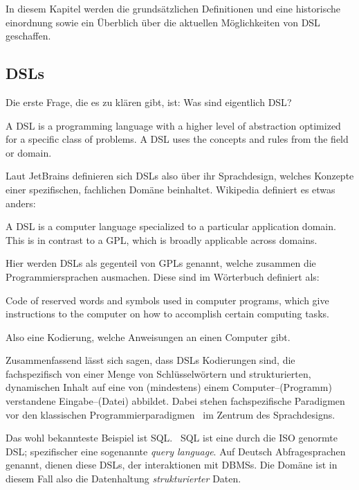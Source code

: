 In diesem Kapitel werden die grundsätzlichen Definitionen und eine historische einordnung sowie ein Überblich über die aktuellen Möglichkeiten von \ac{DSL} geschaffen.

\subsection{\aclp{DSL}}\label{subsec:domain-specific-languages}
Die erste Frage, die es zu klären gibt, ist: Was sind eigentlich \ac{DSL}?
\begin{displayquote}
    A \ac{DSL} is a programming language with a higher level of abstraction optimized for a specific class of problems.
    A \ac{DSL} uses the concepts and rules from the field or domain.
\end{displayquote}
Laut JetBrains definieren sich \acp{DSL} also über ihr Sprachdesign, welches Konzepte einer spezifischen, fachlichen Domäne beinhaltet.
Wikipedia definiert es etwas anders:
\begin{displayquote}
    A \ac{DSL} is a computer language specialized to a particular application domain.
    This is in contrast to a \ac{GPL}, which is broadly applicable across domains.
\end{displayquote}
Hier werden \acp{DSL} als gegenteil von \acp{GPL} genannt, welche zusammen die Programmiersprachen ausmachen.
Diese sind im Wörterbuch definiert als:
\begin{displayquote}
    Code of reserved words and symbols used in computer programs, which give instructions to the computer on how to accomplish certain computing tasks.
\end{displayquote}
Also eine Kodierung, welche Anweisungen an einen Computer gibt.

Zusammenfassend lässt sich sagen, dass \acp{DSL} Kodierungen sind, die fachspezifisch von einer Menge von Schlüsselwörtern und strukturierten, dynamischen Inhalt auf eine von (mindestens) einem Computer--(Programm) verstandene Eingabe--(Datei) abbildet.
Dabei stehen fachspezifische Paradigmen vor den klassischen Programmierparadigmen~\autocite{wikipedia-contributors-2024D} im Zentrum des Sprachdesigns.

Das wohl bekannteste Beispiel ist \ac{SQL}.~\autocite{unknown-author-2023}
\ac{SQL} ist eine durch die \ac{ISO} genormte \ac{DSL}; spezifischer eine sogenannte \textit{query language}.
Auf Deutsch Abfragesprachen genannt, dienen diese \acp{DSL}, der interaktionen mit \acp{DBMS}.
Die Domäne ist in diesem Fall also die Datenhaltung \textit{strukturierter} Daten.

